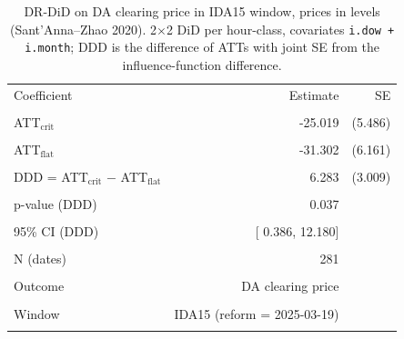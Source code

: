 \begin{table}[H]\centering\small
\caption{DR-DiD on DA clearing price in IDA15 window, prices in levels (Sant'Anna--Zhao 2020). 2$\times$2 DiD per hour-class, covariates \texttt{i.dow + i.month}; DDD is the difference of ATTs with joint SE from the influence-function difference.}\label{tab:reform_csdid_ida15_da}
\begin{tabular}{lrr}
\toprule
Coefficient & Estimate & SE \\\\
\midrule
ATT$_{\text{crit}}$ & -25.019 & (5.486) \\\\
ATT$_{\text{flat}}$ & -31.302 & (6.161) \\\\
DDD = ATT$_{\text{crit}}$ $-$ ATT$_{\text{flat}}$ &   6.283 & (3.009) \\\\
\midrule
p-value (DDD)        & 0.037 & \\\\
95\% CI (DDD)        & [  0.386,  12.180] & \\\\
N (dates)            &   281 & \\\\
Outcome              & DA clearing price & \\\\
Window               & IDA15 (reform = 2025-03-19) & \\\\
\bottomrule
\end{tabular}
\end{table}

